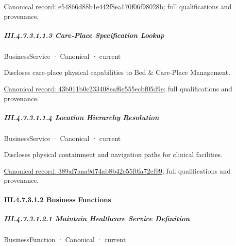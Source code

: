 {\footnotesize \href{../../../../../../../../continuum/business/business-service/e54866d88b1e442f8ea170f06f98028b.md}{Canonical record: e54866d88b1e442f8ea170f06f98028b}; full qualifications and provenance.}\par
\subparagraph*{III.4.7.3.1.1.3 Care-Place Specification Lookup}
\label{navigation:III.4.7.3.1.1.3}

\label{element:43b011b0c233408eaf6e555ecbf05d9e}
{\small BusinessService · Canonical · current}\par

Discloses care-place physical capabilities to Bed \& Care-Place Management.


{\footnotesize \href{../../../../../../../../continuum/business/business-service/43b011b0c233408eaf6e555ecbf05d9e.md}{Canonical record: 43b011b0c233408eaf6e555ecbf05d9e}; full qualifications and provenance.}\par
\subparagraph*{III.4.7.3.1.1.4 Location Hierarchy Resolution}
\label{navigation:III.4.7.3.1.1.4}

\label{element:389af7aaa9d74ab8b42e55f0fa72ef99}
{\small BusinessService · Canonical · current}\par

Discloses physical containment and navigation paths for clinical facilities.


{\footnotesize \href{../../../../../../../../continuum/business/business-service/389af7aaa9d74ab8b42e55f0fa72ef99.md}{Canonical record: 389af7aaa9d74ab8b42e55f0fa72ef99}; full qualifications and provenance.}\par
\paragraph*{III.4.7.3.1.2 Business Functions}
\label{navigation:III.4.7.3.1.2}

\subparagraph*{III.4.7.3.1.2.1 Maintain Healthcare Service Definition}
\label{navigation:III.4.7.3.1.2.1}

\label{element:833a98c58dae416da783ef6e77290576}
{\small BusinessFunction · Canonical · current}\par

